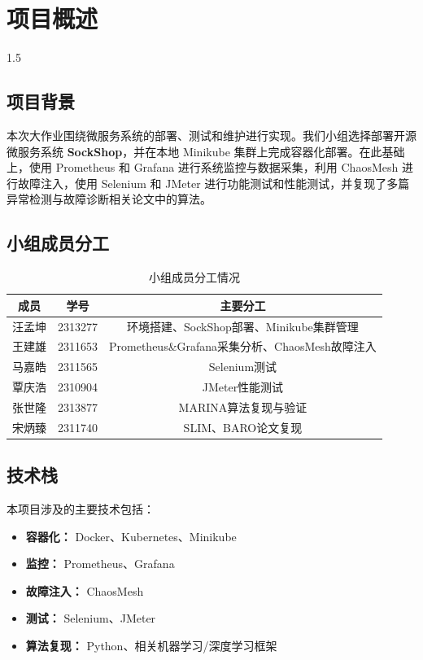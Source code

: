 \documentclass[a4paper,12pt]{report}
\begin{document}
\chapter*{项目概述}
\setcounter{page}{1}
\begin{spacing}{1.5}
\songti{}

\section{项目背景}
本次大作业围绕微服务系统的部署、测试和维护进行实现。我们小组选择部署开源微服务系统 \textbf{SockShop}，并在本地 Minikube 集群上完成容器化部署。在此基础上，使用 Prometheus 和 Grafana 进行系统监控与数据采集，利用 ChaosMesh 进行故障注入，使用 Selenium 和 JMeter 进行功能测试和性能测试，并复现了多篇异常检测与故障诊断相关论文中的算法。

\section{小组成员分工}
\begin{table}[htbp]
\centering
\caption{小组成员分工情况}
\begin{tabular}{ccc}
\toprule
\textbf{成员} & \textbf{学号} & \textbf{主要分工} \\
\midrule
汪孟坤 & 2313277 & 环境搭建、SockShop部署、Minikube集群管理 \\
王建雄 & 2311653 & Prometheus\&Grafana采集分析、ChaosMesh故障注入 \\
马嘉皓 & 2311565 & Selenium测试 \\
覃庆浩 & 2310904 & JMeter性能测试 \\
张世隆 & 2313877 & MARINA算法复现与验证 \\
宋炳臻 & 2311740 & SLIM、BARO论文复现 \\
\bottomrule
\end{tabular}
\end{table}

\section{技术栈}
本项目涉及的主要技术包括：
\begin{itemize}
    \item \textbf{容器化：} Docker、Kubernetes、Minikube
    \item \textbf{监控：} Prometheus、Grafana
    \item \textbf{故障注入：} ChaosMesh
    \item \textbf{测试：} Selenium、JMeter
    \item \textbf{算法复现：} Python、相关机器学习/深度学习框架
\end{itemize}


\end{spacing}
\end{document}
